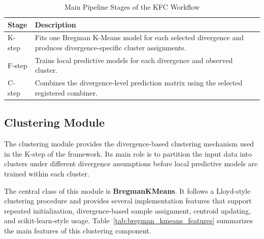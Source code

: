 \begin{table}[H]
      \centering
      \caption{Main Pipeline Stages of the KFC Workflow}
      \label{tab:kfc_pipeline_stages}
      \renewcommand{\arraystretch}{1.2}
      \begin{tabularx}{\textwidth}{
                  >{\raggedright\arraybackslash}p{2.5cm}
                  >{\raggedright\arraybackslash}X
            }
            \toprule
            \textbf{Stage} & \textbf{Description}                                                                             \\
            \midrule
            K-step         &
            Fits one Bregman K-Means model for each selected divergence and produces divergence-specific cluster assignments. \\

            F-step         &
            Trains local predictive models for each divergence and observed cluster.                                          \\

            C-step         &
            Combines the divergence-level prediction matrix using the selected registered combiner.                           \\
            \bottomrule
      \end{tabularx}
\end{table}

\subsection{Clustering Module}

\hs The clustering module provides the divergence-based clustering mechanism used in the K-step of the \KFCProcedure{} framework. Its main role is to partition the input data into clusters under different divergence assumptions before local predictive models are trained within each cluster.

The central class of this module is \textbf{BregmanKMeans}. It follows a Lloyd-style clustering procedure and provides several implementation features that support repeated initialization, divergence-based sample assignment, centroid updating, and scikit-learn-style usage. Table~\ref{tab:bregman_kmeans_features} summarizes the main features of this clustering component.


